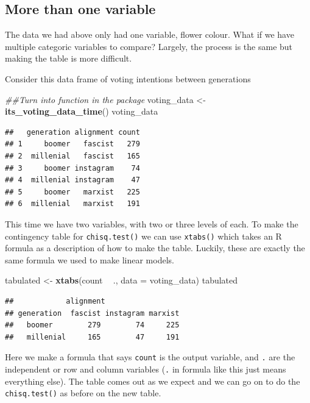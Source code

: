 \documentclass[
]{book}
\newenvironment{Shaded}{\begin{snugshade}}{\end{snugshade}}
\newcommand{\CommentTok}[1]{\textcolor[rgb]{0.56,0.35,0.01}{\textit{#1}}}
\newcommand{\DataTypeTok}[1]{\textcolor[rgb]{0.13,0.29,0.53}{#1}}
\newcommand{\KeywordTok}[1]{\textcolor[rgb]{0.13,0.29,0.53}{\textbf{#1}}}
\newcommand{\NormalTok}[1]{#1}
\newcommand{\OperatorTok}[1]{\textcolor[rgb]{0.81,0.36,0.00}{\textbf{#1}}}
\newcommand{\StringTok}[1]{\textcolor[rgb]{0.31,0.60,0.02}{#1}}
\begin{document}
\hypertarget{more-than-one-variable}{%
\subsection{More than one variable}\label{more-than-one-variable}}

The data we had above only had one variable, flower colour. What if we have multiple categoric variables to compare? Largely, the process is the same but making the table is more difficult.

Consider this data frame of voting intentions between generations

\begin{Shaded}
\begin{Highlighting}[]
\CommentTok{##Turn into function in the package}
\NormalTok{voting_data <-}\StringTok{ }\KeywordTok{its_voting_data_time}\NormalTok{()}
\NormalTok{voting_data}
\end{Highlighting}
\end{Shaded}

\begin{verbatim}
##   generation alignment count
## 1     boomer   fascist   279
## 2  millenial   fascist   165
## 3     boomer instagram    74
## 4  millenial instagram    47
## 5     boomer   marxist   225
## 6  millenial   marxist   191
\end{verbatim}

This time we have two variables, with two or three levels of each. To make the contingency table for \texttt{chisq.test()} we can use \texttt{xtabs()} which takes an R formula as a description of how to make the table. Luckily, these are exactly the same formula we used to make linear models.

\begin{Shaded}
\begin{Highlighting}[]
\NormalTok{tabulated <-}\StringTok{ }\KeywordTok{xtabs}\NormalTok{(count }\OperatorTok{~}\StringTok{ }\NormalTok{., }\DataTypeTok{data =}\NormalTok{ voting_data)}
\NormalTok{tabulated}
\end{Highlighting}
\end{Shaded}

\begin{verbatim}
##            alignment
## generation  fascist instagram marxist
##   boomer        279        74     225
##   millenial     165        47     191
\end{verbatim}

Here we make a formula that says \texttt{count} is the output variable, and \texttt{.} are the independent or row and column variables (\texttt{.} in formula like this just means everything else). The table comes out as we expect and we can go on to do the \texttt{chisq.test()} as before on the new table.
\end{document}
